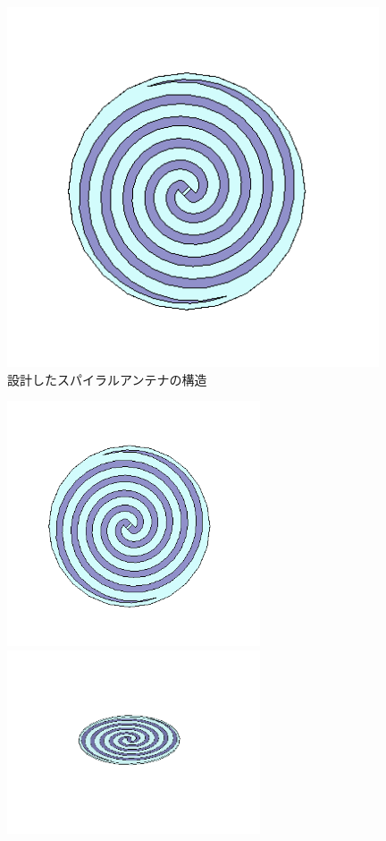 \documentclass[11pt,a4paper,uplatex]{ujarticle}
\begin{document}
  \begin{figure}[hbtp]
    \centering
    \includegraphics[keepaspectratio, width=110mm]{Images/spiral_antenna_configuration.png}
    \caption{設計したスパイラルアンテナの構造}
    \label{fig:spiral_antenna_configuration}
  \end{figure}

  \begin{figure}[tbp]
    \begin{minipage}[b]{0.5\textwidth}
      \centering
      \includegraphics[keepaspectratio, width=75mm]{Images/spiral_antenna_configuration.png}
    \end{minipage}
    \begin{minipage}[b]{0.5\textwidth}
      \centering
      \includegraphics[keepaspectratio, width=75mm]{Images/spiral_withoutcord.png}
    \end{minipage}
  \end{figure}
\end{document}
